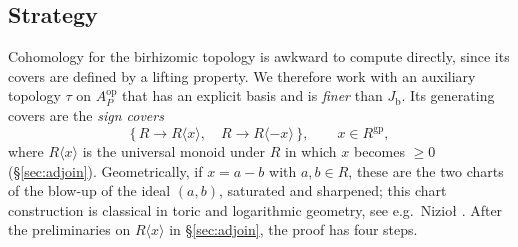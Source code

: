 \documentclass[12pt]{article}
\newcommand{\gp}{\mathrm{gp}}
\newcommand{\Jb}{J_{\mathrm b}}
\theoremstyle{definition}
\theoremstyle{remark}
\begin{document}
\subsection{Strategy}

Cohomology for the birhizomic topology is awkward to compute directly, since
its covers are defined by a lifting property.  We therefore work with an
auxiliary topology \(\tau\) on \(A_P^{\mathrm{op}}\) that has an explicit
basis and is \emph{finer} than \(\Jb\).  Its generating covers are the
\emph{sign covers}
\[
   \{\,R\to R\langle x\rangle,\quad R\to R\langle -x\rangle\,\},
   \qquad x\in R^{\gp},
\]
where \(R\langle x\rangle\) is the universal monoid under \(R\) in which
\(x\) becomes \(\ge0\) (\S\ref{sec:adjoin}).  Geometrically, if \(x=a-b\) with
\(a,b\in R\), these are the two charts of the blow-up of the ideal
\((a,b)\), saturated and sharpened; this chart construction is classical in
toric and logarithmic geometry, see e.g.\ Nizio{\l} \cite[\S4]{niziol}.
After the preliminaries on \(R\langle x\rangle\) in \S\ref{sec:adjoin},
the proof has four steps.
\end{document}
